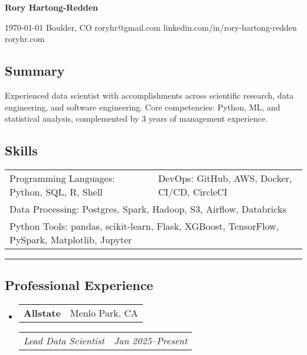 \documentclass[10pt,letterpaper]{article}
\makeatletter
\newenvironment{indentsection}[1]
{\begin{list}{}%
	{\setlength{\leftmargin}{#1}}
	\item[]%
}
{\end{list}}
\newcommand{\headerrow}[2]{
\begin{tabular*}{\linewidth}{l@{\extracolsep{\fill}}r}
		#1 &
		#2 \\
	\end{tabular*}
}
\newcommand{\jobitem}[4]{\item \headerrow{\textbf{#1}}{#2}
\headerrow{\emph{#3}}{\emph{#4}}}
\makeatother
\begin{document}
{\raggedright \LARGE \bf Rory Hartong-Redden}

{\raggedleft 
\today \/ \textbar
\/ Boulder, CO \textbar
\/ roryhr@gmail.com \textbar
\/ linkedin.com/in/rory-hartong-redden \textbar
\/ roryhr.com
\\
}


\subsection*{Summary}
\begin{centering}
Experienced data scientist with accomplishments across scientific research, data engineering, and software engineering. 
Core competencies: Python, ML, and statistical analysis, complemented by 3 years of management experience. 
\end{centering}

\subsection*{Skills}

\begin{indentsection}{\parindent}
\begin{tabular}{p{0.5\linewidth}   p{0.5\linewidth}} 
	Programming Languages: Python, SQL, R, Shell
	& DevOps: GitHub, AWS, Docker,  CI/CD, CircleCI \\

	\multicolumn{2}{l}{Data Processing: Postgres, Spark, Hadoop, S3, Airflow, Databricks} \\
	\multicolumn{2}{l}{
		Python Tools: pandas, scikit-learn, Flask, XGBoost, TensorFlow, PySpark, Matplotlib, Jupyter
		}
\end{tabular}
\end{indentsection}

\hrule
\subsection*{Professional Experience}
\begin{itemize}
	\jobitem{Allstate}{Menlo Park, CA}
		     {Lead Data Scientist}{Jan 2025--Present}
\end{itemize}
\end{document}
